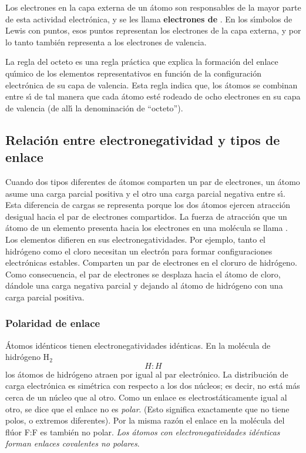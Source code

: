 Los electrones en la capa externa de un \'atomo son responsables de la mayor parte de esta actividad electr\'onica, y se les llama \textbf{electrones de }. En los s\'{\i}mbolos de Lewis con puntos, esos puntos representan los electrones de la capa externa, y por lo tanto tambi\'en representa a los electrones de valencia.

La regla del octeto es una regla pr\'actica que explica la formaci\'on del enlace qu\'{\i}mico de los elementos representativos en funci\'on de la configuraci\'on electr\'onica de su capa de valencia. Esta regla indica que, los \'atomos se combinan entre s\'{\i} de tal manera que cada \'atomo est\'e rodeado de ocho electrones en su capa de valencia (de all\'{\i} la denominaci\'on de ``octeto'').

\subsection[Electronegatividad y tipos de enlace]{Relaci\'on entre electronegatividad y tipos de enlace}


Cuando dos tipos diferentes de \'atomos comparten un par de electrones, un  \'atomo asume una carga parcial positiva y el otro una carga parcial negativa
entre s\'{\i}. Esta diferencia de cargas se representa porque los dos \'atomos  ejercen atracci\'on desigual hacia el par de electrones compartidos. La fuerza
de atracci\'on que un \'atomo de un elemento presenta hacia los electrones en  una mol\'ecula se llama \textbf{}.
 Los elementos difieren en sus electronegatividades. Por ejemplo, tanto el hidr\'ogeno como el cloro necesitan un electr\'on para formar
configuraciones electr\'onicas estables. Comparten un par de electrones en el cloruro de hidr\'ogeno. Como consecuencia, el par de electrones se desplaza hacia el
\'atomo de cloro, d\'andole una carga negativa parcial y dejando al \'atomo de hidr\'ogeno con una carga parcial positiva.

\subsubsection{Polaridad de enlace}
\'Atomos id\'enticos tienen electronegatividades id\'enticas. En la mol\'ecula
de hidr\'ogeno H$_2$  $$H:H$$ los \'atomos de hidr\'ogeno atraen por igual al par
electr\'onico. La distribuci\'on de carga electr\'onica es sim\'etrica con respecto
a los dos n\'ucleos; es decir, no est\'a m\'as cerca de un n\'ucleo que al otro. 
Como un enlace es e\-lec\-trost\'aticamente igual al otro, se dice que el enlace no
es \textit{polar}.  (Esto significa
exactamente que no tiene polos, o extremos diferentes). Por la misma raz\'on el
enlace  en la mol\'ecula del fl\'uor F:F es tambi\'en no polar. \textit{Los \'atomos
con electronegatividades id\'enticas forman enlaces covalentes no polares}.

